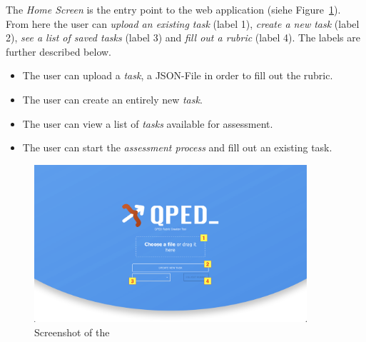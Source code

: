 The \textit{Home Screen} is the entry point to the web application (siehe Figure~\ref{fig:homescreen}).
From here the user can \textit{upload an existing task} (label 1), \textit{create a new task} (label 2), \textit{see a list of saved tasks} (label 3) and \textit{fill out a rubric} (label 4). The labels are further described below.

\begin{itemize}
  \item[\textbf{1:}] The user can upload a \textit{task}, a JSON-File in order to fill out the rubric.
  \item[\textbf{2:}] The user can create an entirely new \textit{task}.
  \item[\textbf{3:}] The user can view a list of \textit{tasks} available for assessment.
  \item[\textbf{4:}] The user can start the \textit{assessment process} and fill out an existing task.
\end{itemize}

\begin{figure}[h]
  \begin{center}
    \includegraphics[width=0.9\textwidth]{figures/homescreen}
  \end{center}
  \caption{Screenshot of the }
  \label{fig:homescreen}
\end{figure}


